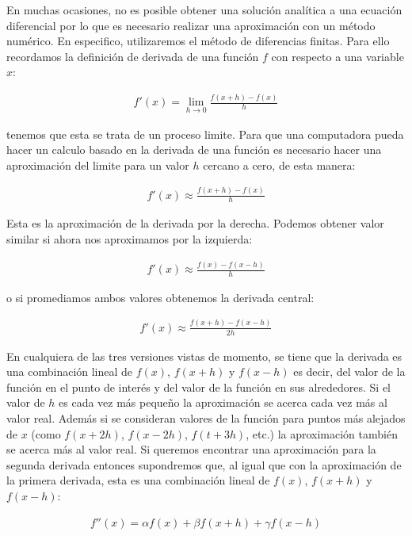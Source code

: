 \documentclass[12pt]{article}
\begin{document}
En muchas ocasiones, no es posible obtener una solución analítica a una ecuación diferencial por lo que es necesario realizar una aproximación con un método numérico. En especifico, utilizaremos el método de diferencias finitas. Para ello recordamos la definición de derivada de una función $f$ con respecto a una variable $x$:

\begin{align*}
    f'(x) = \lim_{h\rightarrow 0}\frac{f(x+h)-f(x)}{h}
\end{align*}

tenemos que esta se trata de un proceso limite. Para que una computadora pueda hacer un calculo basado en la derivada de una función es necesario hacer una aproximación del limite para un valor $h$ cercano a cero, de esta manera:

\begin{align*}
    f'(x) \approx\frac{f(x+h)-f(x)}{h}
\end{align*}

Esta es la aproximación de la derivada por la derecha. Podemos obtener valor similar si ahora nos aproximamos por la izquierda:

\begin{align*}
    f'(x) \approx\frac{f(x)-f(x-h)}{h}
\end{align*}

o si promediamos ambos valores obtenemos la derivada central:

\begin{align*}
    f'(x) \approx\frac{f(x+h)-f(x-h)}{2h}
\end{align*}

En cualquiera de las tres versiones vistas de momento, se tiene que la derivada es una combinación lineal de $f(x)$, $f(x+h)$ y $f(x-h)$ es decir, del valor de la función en el punto de interés y del valor de la función en sus alrededores. Si el valor de $h$ es cada vez más pequeño la aproximación se acerca cada vez más al valor real. Además si se consideran valores de la función para puntos más alejados de $x$ (como $f(x+2h)$, $f(x-2h)$, $f(t+3h)$, etc.) la aproximación también se acerca más al valor real. Si queremos encontrar una aproximación para la segunda derivada entonces supondremos que, al igual que con la aproximación de la primera derivada,  esta es una combinación lineal de $f(x)$, $f(x+h)$ y $f(x-h)$:

\begin{align*}
    f''(x) = \alpha f(x) + \beta f(x+h) + \gamma f(x-h)
\end{align*}
\end{document}
